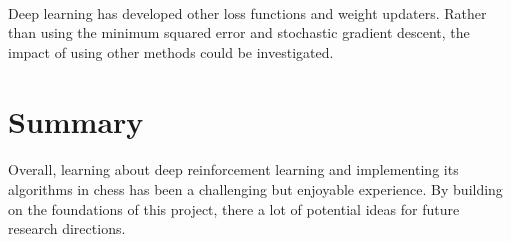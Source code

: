 \documentclass[12pt,a4paper]{book}
\begin{document}
\paragraph{} Deep learning has developed other loss functions and weight updaters. Rather than using the minimum squared error and stochastic gradient descent, the impact of using other methods could be investigated.

\section{Summary}

\paragraph{} Overall, learning about deep reinforcement learning and implementing its algorithms in chess has been a challenging but enjoyable experience. By building on the foundations of this project, there a lot of potential ideas for future research directions.

%
%
\end{document}
